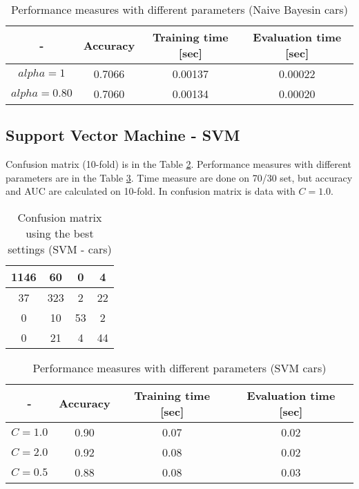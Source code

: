 \documentclass[11pt,a4paper,titlepage]{article}
\begin{document}
  \begin{table}
  \centering
  \begin{tabular}{| c | c | c | c |}
    \hline
     		-	   & Accuracy & Training time [sec] & Evaluation time [sec] \\ \hline
    $alpha = 1$ &  0.7066	  		& 	0.00137		  & 		0.00022 		\\ \hline
    $alpha= 0.80$ & 	0.7060	 		& 		0.00134			  &			0.00020 		\\ \hline
    
  \end{tabular}
  \caption{Performance measures with different parameters (Naive Bayesin cars)}
  \label{table:NaiveBaycars}
  \end{table}

\subsection{Support Vector Machine - SVM}

Confusion matrix (10-fold) is in the Table \ref{table:confusionMatrixSVMcars}. Performance measures with different parameters are in the Table \ref{table:SVMcars}. Time measure are done on 70/30 set, but accuracy and AUC are calculated on 10-fold. In confusion matrix is data with $C = 1.0$. 
\begin{table}
  \centering
  \begin{tabular}{| c | c | c | c |}
    \hline
   	    1146  & 60  &   0  &  4 \\ \hline
          37  & 323 &   2  &  22 \\ \hline
          0  &  10  &  53   &  2 \\ \hline
          0  &  21  &  4   & 44 \\
    \hline
  \end{tabular}
  \caption{Confusion matrix using the best settings (SVM - cars)}
  \label{table:confusionMatrixSVMcars}
  \end{table}
  
  \begin{table}
  \centering
  \begin{tabular}{| c | c | c | c |}
    \hline
     		-	   & Accuracy & Training time [sec] & Evaluation time [sec] \\ \hline
    $C = 1.0$ &  0.90	  		& 	0.07		  & 		0.02 		\\ \hline
    $C = 2.0$ & 	0.92	 		& 		0.08			  &			0.02 		\\ \hline
    $C = 0.5$ & 		  0.88			  &			0.08 & 0.03		\\ 
    \hline
  \end{tabular}
  \caption{Performance measures with different parameters (SVM cars)}
  \label{table:SVMcars}
  \end{table}
\end{document}
